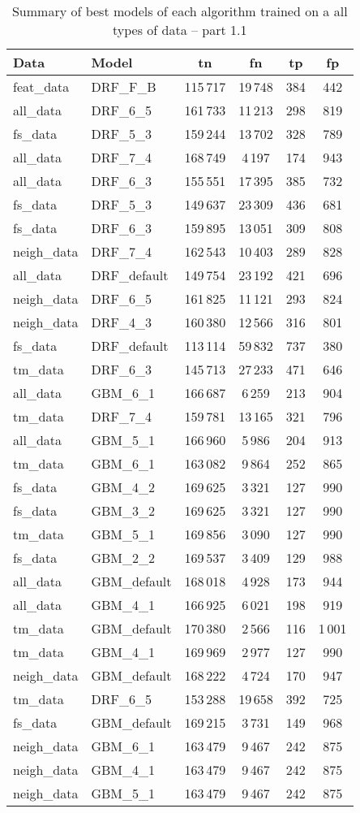 \documentclass[thesis=M,english]{FITthesis}[2012/10/20]
\begin{document}
\begin{table}[H]\centering
\begin{small}
    \caption{Summary of best models of each algorithm trained on a all types of data -- part 1.1}\label{tab:all_data_summary_1_1}
    \begin{tabular}{|l|l|c|c|c|c|}\hline
        Data & Model & \gls{tn} & \gls{fn} & \gls{tp} & \gls{fp} \tabularnewline \hline \hline
feat\_data & DRF\_F\_B & 115\,717 & 19\,748 & 384 & 442 \tabularnewline  \hline 
all\_data & DRF\_6\_5 & 161\,733 & 11\,213 & 298 & 819 \tabularnewline  \hline 
fs\_data & DRF\_5\_3 & 159\,244 & 13\,702 & 328 & 789 \tabularnewline  \hline 
all\_data & DRF\_7\_4 & 168\,749 & 4\,197 & 174 & 943 \tabularnewline  \hline 
all\_data & DRF\_6\_3 & 155\,551 & 17\,395 & 385 & 732 \tabularnewline  \hline 
fs\_data & DRF\_5\_3 & 149\,637 & 23\,309 & 436 & 681 \tabularnewline  \hline 
fs\_data & DRF\_6\_3 & 159\,895 & 13\,051 & 309 & 808 \tabularnewline  \hline 
neigh\_data & DRF\_7\_4 & 162\,543 & 10\,403 & 289 & 828 \tabularnewline  \hline 
all\_data & DRF\_default & 149\,754 & 23\,192 & 421 & 696 \tabularnewline  \hline 
neigh\_data & DRF\_6\_5 & 161\,825 & 11\,121 & 293 & 824 \tabularnewline  \hline 
neigh\_data & DRF\_4\_3 & 160\,380 & 12\,566 & 316 & 801 \tabularnewline  \hline 
fs\_data & DRF\_default & 113\,114 & 59\,832 & 737 & 380 \tabularnewline  \hline 
tm\_data & DRF\_6\_3 & 145\,713 & 27\,233 & 471 & 646 \tabularnewline  \hline 
all\_data & GBM\_6\_1 & 166\,687 & 6\,259 & 213 & 904 \tabularnewline  \hline 
tm\_data & DRF\_7\_4 & 159\,781 & 13\,165 & 321 & 796 \tabularnewline  \hline 
all\_data & GBM\_5\_1 & 166\,960 & 5\,986 & 204 & 913 \tabularnewline  \hline 
tm\_data & GBM\_6\_1 & 163\,082 & 9\,864 & 252 & 865 \tabularnewline  \hline 
fs\_data & GBM\_4\_2 & 169\,625 & 3\,321 & 127 & 990 \tabularnewline  \hline 
fs\_data & GBM\_3\_2 & 169\,625 & 3\,321 & 127 & 990 \tabularnewline  \hline 
tm\_data & GBM\_5\_1 & 169\,856 & 3\,090 & 127 & 990 \tabularnewline  \hline 
fs\_data & GBM\_2\_2 & 169\,537 & 3\,409 & 129 & 988 \tabularnewline  \hline 
all\_data & GBM\_default & 168\,018 & 4\,928 & 173 & 944 \tabularnewline  \hline 
all\_data & GBM\_4\_1 & 166\,925 & 6\,021 & 198 & 919 \tabularnewline  \hline 
tm\_data & GBM\_default & 170\,380 & 2\,566 & 116 & 1\,001 \tabularnewline  \hline 
tm\_data & GBM\_4\_1 & 169\,969 & 2\,977 & 127 & 990 \tabularnewline  \hline 
neigh\_data & GBM\_default & 168\,222 & 4\,724 & 170 & 947 \tabularnewline  \hline 
tm\_data & DRF\_6\_5 & 153\,288 & 19\,658 & 392 & 725 \tabularnewline  \hline 
fs\_data & GBM\_default & 169\,215 & 3\,731 & 149 & 968 \tabularnewline  \hline 
neigh\_data & GBM\_6\_1 & 163\,479 & 9\,467 & 242 & 875 \tabularnewline  \hline 
neigh\_data & GBM\_4\_1 & 163\,479 & 9\,467 & 242 & 875 \tabularnewline  \hline 
neigh\_data & GBM\_5\_1 & 163\,479 & 9\,467 & 242 & 875 \tabularnewline  \hline 
    \end{tabular}
\end{small}
\end{table}
\end{document}
